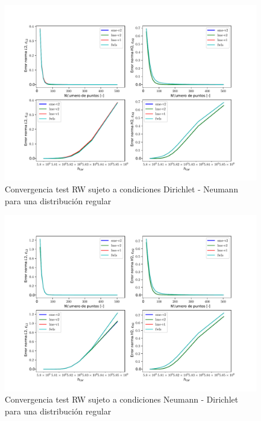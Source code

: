 \begin{figure}
    \centering
    \includegraphics[width=1\textwidth]{./Imagenes/06/comparacion_shp_regular/RW_regular_type-2_caso-2_direct_dgesv-lapack-blas_sme-v2_lme-v2_lme-v1_fwls.pdf}
    \caption{Convergencia test RW sujeto a condiciones Dirichlet - Neumann para una distribución regular} \label{fig:RW_caso-2_conv}
\end{figure}
\begin{figure}
    \centering
    \includegraphics[width=1\textwidth]{./Imagenes/06/comparacion_shp_regular/RW_regular_type-2_caso-3_direct_dgesv-lapack-blas_sme-v2_lme-v2_lme-v1_fwls.pdf}
    \caption{Convergencia test RW sujeto a condiciones Neumann - Dirichlet para una distribución regular} \label{fig:RW_caso-3_conv}
\end{figure}
